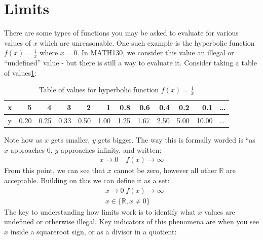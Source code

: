 \section{Limits}
\label{sec:Limits}
There are some types of functions you may be asked to evaluate for various
values of $x$ which are unreasonable. One such example is the hyperbolic
function $f(x) = \frac{1}{x} $ where $x = 0$. In MATH130, we consider this value
an illegal or ``undefined'' value - but there is still a way to evaluate it.
Consider taking a table of values\ref{tab:LimitsHyperbolaExample}:
\begin{table}[!hbt]
\label{tab:LimitsHyperbolaExample}
\begin{tabularx}{\textwidth}{| c || r | r | r | r | r | r | r | r | r | r | X |}
  \hline
  x & 5    & 4    & 3    & 2    & 1    & 0.8  & 0.6  & 0.4  & 0.2  & 0.1 & \ldots \\
  \hline
  y & 0.20 & 0.25 & 0.33 & 0.50 & 1.00 & 1.25 & 1.67 & 2.50 & 5.00 & 10.00 &
  \ldots \\
  \hline
\hline
\end{tabularx}
\caption{Table of values for hyperbolic function $f(x) = \frac{1}{x}$}
\end{table}
Note how as $x$ gets smaller, $y$ gets bigger. The way this is formally worded
is ``as $x$ approaches $0$, $y$ approaches infinity, and written:
\begin{align}
  x \to 0 & \; f(x) \to \infty
\end{align}
From this point, we can see that $x$ cannot be zero, however all other
$\mathbb{R}$ are acceptable. Building on this we can define it as a set:
\begin{align}
  & x \to 0 \; f(x) \to \infty \nonumber \\
  & x \in \{ \mathbb{R}, x \neq 0 \}
\end{align}
The key to understanding how limits work is to identify what $x$ values are
undefined or otherwise illegal. Key indicators of this phenomena are when you
see $x$ inside a squareroot sign, or as a divisor in a quotient: 
